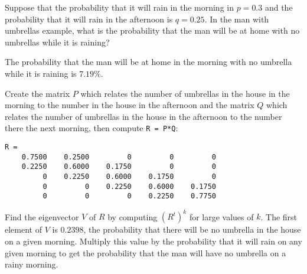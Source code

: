 \documentclass{ximera}
\begin{document}
\begin{computerExercise} \label{c4.10.8}
Suppose that the probability that it will rain in the morning in $p=0.3$ and
the probability that it will rain in the afternoon is $q=0.25$.  In the man
with umbrellas example, what is the probability that the man will be at home
with no umbrellas while it is raining?

\begin{solution}

\ans The probability that the man will be at home in the morning with
no umbrella while it is raining is $7.19\%$. 

\soln Create the matrix $P$ which relates the number of umbrellas in the
house in the morning to the number in the house in the afternoon and the
matrix $Q$ which relates the number of umbrellas in the house in the
afternoon to the number there the next morning, then compute {\tt R = P*Q}:
\begin{verbatim}
R =
    0.7500    0.2500         0         0         0
    0.2250    0.6000    0.1750         0         0
         0    0.2250    0.6000    0.1750         0
         0         0    0.2250    0.6000    0.1750
         0         0         0    0.2250    0.7750
\end{verbatim}
Find the eigenvector $V$ of $R$ by computing $(R^t)^k$ for large values
of $k$.  The first element of $V$ is $0.2398$, the probability that there
will be no umbrella in the house on a given morning.  Multiply this
value by the probability that it will rain on any given morning to get
the probability that the man will have no umbrella on a rainy morning.


\end{solution}
\end{computerExercise}
\end{document}
